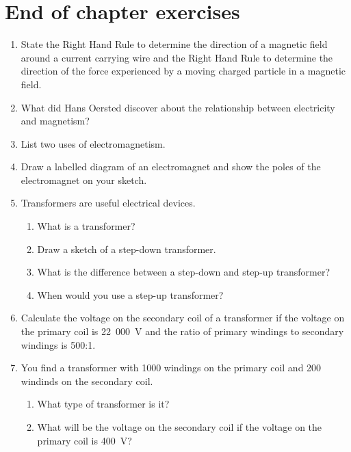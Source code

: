 \section{End of chapter exercises}
\begin {enumerate}
\item State the Right Hand Rule to determine the direction of a magnetic field around a current carrying wire and the Right Hand Rule to determine the direction of the force experienced by a moving charged particle in a magnetic field.
\item What did Hans Oersted discover about the relationship between electricity and magnetism?
\item List two uses of electromagnetism.
\item Draw a labelled diagram of an electromagnet and show the poles of the electromagnet on your sketch.
\item Transformers are useful electrical devices.
\begin{enumerate}
\item What is a transformer?
\item Draw a sketch of a step-down transformer.
\item What is the difference between a step-down and step-up transformer?
\item When would you use a step-up transformer?

\end{enumerate} 

\item Calculate the voltage on the secondary coil of a transformer if the voltage on the primary coil is 22~000~V and the ratio of primary windings to secondary windings is 500:1.

\item You find a transformer with 1000 windings on the primary coil and 200 windinds on the secondary coil.
\begin{enumerate}
\item What type of transformer is it?
\item What will be the voltage on the secondary coil if the voltage on the primary coil is 400~V?

\end{enumerate}


\end{enumerate}
